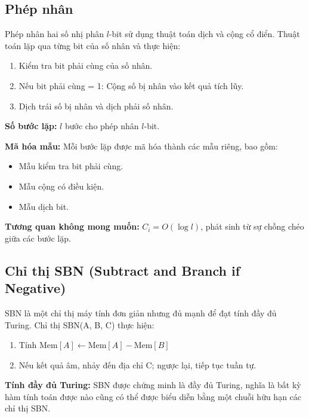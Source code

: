 \subsection{Phép nhân}

Phép nhân hai số nhị phân $l$-bit sử dụng thuật toán dịch và cộng cổ điển. Thuật toán lặp qua từng bit của số nhân và thực hiện:
\begin{enumerate}
    \item Kiểm tra bit phải cùng của số nhân.
    \item Nếu bit phải cùng = 1: Cộng số bị nhân vào kết quả tích lũy.
    \item Dịch trái số bị nhân và dịch phải số nhân.
\end{enumerate}

\textbf{Số bước lặp:} $l$ bước cho phép nhân $l$-bit.

\vspace{0.3cm}

\textbf{Mã hóa mẫu:} Mỗi bước lặp được mã hóa thành các mẫu riêng, bao gồm:

\begin{itemize}
    \item Mẫu kiểm tra bit phải cùng.
    \item Mẫu cộng có điều kiện.
    \item Mẫu dịch bit.
\end{itemize}

\vspace{-0.1cm}

\textbf{Tương quan không mong muốn:} $C_i = O(\log l)$, phát sinh từ sự chồng chéo giữa các bước lặp.

\subsection{Chỉ thị SBN (Subtract and Branch if Negative)}

SBN là một chỉ thị máy tính đơn giản nhưng đủ mạnh để đạt tính đầy đủ Turing. Chỉ thị SBN(A, B, C) thực hiện:
\begin{enumerate}
    \item Tính $\text{Mem}[A] \leftarrow \text{Mem}[A] - \text{Mem}[B]$
    \item Nếu kết quả âm, nhảy đến địa chỉ C; ngược lại, tiếp tục tuần tự.
\end{enumerate}

\textbf{Tính đầy đủ Turing:} SBN được chứng minh là đầy đủ Turing, nghĩa là bất kỳ hàm tính toán được nào cũng có thể được biểu diễn bằng một chuỗi hữu hạn các chỉ thị SBN.

